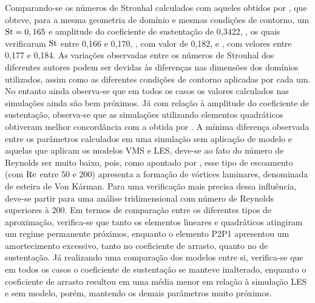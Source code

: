 Comparando-se os números de Strouhal calculados com aqueles obtidos por , que obteve, para a mesma geometria de domínio e mesmas condições de contorno, um $\mathrm{St}=0,165$ e amplitude do coeficiente de sustentação de 0,3422, , os quais verificaram $\mathrm{St}$ entre 0,166 e 0,170, , com valor de 0,182, e , com velores entre 0,177 e 0,184. As variações observadas entre os números de Strouhal dos diferentes autores podem ser devidas às diferenças nas dimensões dos domínios utilizados, assim como as diferentes condições de contorno aplicadas por cada um. No entanto ainda observa-se que em todos os casos os valores calculados nas simulações ainda são bem próximos. Já com relação à amplitude do coeficiente de sustentação, observa-se que as simulações utilizando elementos quadráticos obtiveram melhor concordância com a obtida por . A mínima diferença observada entre os parâmetros calculados em uma simulação sem aplicação de modelo e aquelas que aplicam os modelos VMS e LES, deve-se ao fato do número de Reynolds ser muito baixo, pois, como apontado por , esse tipo de escoamento (com $\mathrm{Re}$ entre 50 e 200) apresenta a formação de vórtices laminares, denominada de esteira de Von Kárman. Para uma verificação mais precisa dessa influência, deve-se partir para uma análise tridimensional com número de Reynolds superiores à 200. Em termos de comparação entre os diferentes tipos de aproximação, verifica-se que tanto os elementos lineares e quadráticos atingiram um regime permanente próximos, enquanto o elemento P2P1 apresentou um amortecimento excessivo, tanto no coeficiente de arrasto, quanto no de sustentação. Já realizando uma comparação dos modelos entre si, verifica-se que em todos os casos o coeficiente de sustentação se manteve inalterado, enquanto o coeficiente de arrasto resultou em uma média menor em relação à simulação LES e sem modelo, porém, mantendo os demais parâmetros muito próximos.


